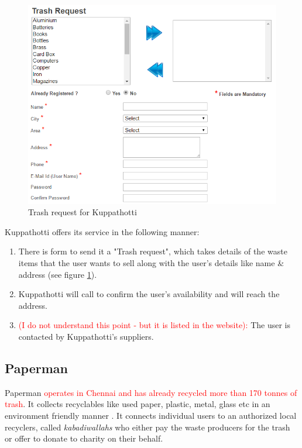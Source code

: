 \documentclass[10pt]{article}
\begin{document}
\begin{figure}
\includegraphics[width=\columnwidth]{images/Kuppathotti_trashRequest}
\caption{Trash request for Kuppathotti \citep{Kuppathotti:home}}
\label{Kuppathotti_trashRequest}
\end{figure}

Kuppathotti offers its service in the following manner:
\begin{enumerate}
\item There is form to send it a "Trash request", which takes details of the waste items that the user wants to sell along with the user's details like name \& address (see figure \ref{Kuppathotti_trashRequest}).
\item Kuppathotti will call to confirm the user's availability and will reach the address.
\item \textcolor{red}{(I do not understand this point - but it is listed in the website):} The user is contacted by Kuppathotti's suppliers.
\end{enumerate}

\subsection {Paperman}

Paperman \textcolor{red}{operates in Chennai and has already recycled more than 170 tonnes of trash}. It collects recyclables like used paper, plastic, metal, glass etc in an environment friendly manner \citep{Paperman:home}. It connects individual users to an authorized local recyclers, called \emph{kabadiwallahs} who either pay the waste producers for the trash or offer to donate to charity on their behalf.
\end{document}
